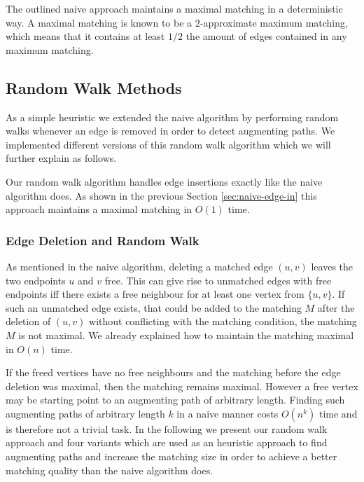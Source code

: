 \documentclass{article}      %
\begin{document}
The outlined naive approach maintains a maximal matching in a deterministic way. A maximal matching is known to be a $2$-approximate maximum matching, which means that it contains at least $1/2$ the amount of edges contained in any maximum matching.

\subsection{Random Walk Methods}
\label{sec:random-walk}

As a simple heuristic we extended the naive algorithm by performing random walks whenever an edge is removed in order to detect augmenting paths. We implemented different versions of this random walk algorithm which we will further explain as follows.

Our random walk algorithm handles edge insertions exactly like the naive algorithm does. As shown in the previous Section \ref{sec:naive-edge-in} this approach maintains a maximal matching in $O(1)$ time.

\subsubsection{Edge Deletion and Random Walk}
\label{sec:rw-edge-out}

As mentioned in the naive algorithm, deleting a matched edge $(u,v)$ leaves the two endpoints $u$ and $v$ free. This can give rise to unmatched edges with free endpoints iff there exists a free neighbour for at least one vertex from $\{u,v\}$. If such an unmatched edge exists, that could be added to the matching $M$ after the deletion of $(u,v)$ without conflicting with the matching condition, the matching $M$ is not maximal. We already explained how to maintain the matching maximal in $O(n)$ time. 

If the freed vertices have no free neighbours and the matching before the edge deletion was maximal, then the matching remains maximal. However a free vertex may be starting point to an augmenting path of arbitrary length. Finding such augmenting paths of arbitrary length $k$ in a naive manner costs $O(n^k)$ time and is therefore not a trivial task. In the following we present our random walk approach and four variants which are used as an heuristic approach to find augmenting paths and increase the matching size in order to achieve a better matching quality than the naive algorithm does.
\end{document}

